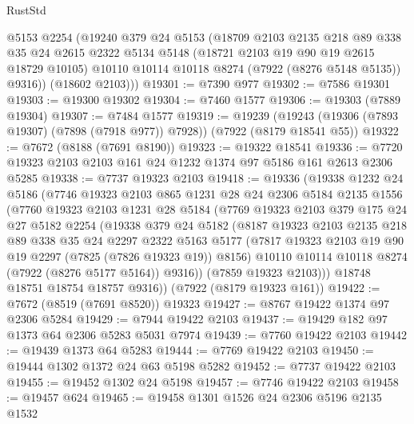 \begin{lexlean}{RustStd}
\begin{coremodule}
        @5153
        @2254
        (@19240
          @379
          @24
          @5153
          (@18709
            @2103
            @2135
            @218
            @89
            @338
            @35
            @24
            @2615
            @2322
            @5134
            @5148
            (@18721 @2103 @19 @90 @19 @2615 @18729 @10105)
            @10110
            @10114
            @10118
            @8274
            (@7922 (@8276 @5148 @5135))
            @9316))
        (@18602 @2103)))
@19301 := @7390 @977
@19302 := @7586 @19301
@19303 := @19300 @19302
@19304 := @7460 @1577
@19306 := @19303 (@7889 @19304)
@19307 := @7484 @1577
@19319 := @19239
    (@19243 (@19306 (@7893 @19307) (@7898 (@7918 @977)) @7928))
    (@7922 (@8179 @18541 @55))
@19322 := @7672 (@8188 (@7691 @8190))
@19323 := @19322 @18541
@19336 := @7720 @19323 @2103 @2103 @161 @24 @1232 @1374 @97 @5186 @161 @2613 @2306 @5285
@19338 := @7737 @19323 @2103
@19418 := @19336
    (@19338
      @1232
      @24
      @5186
      (@7746
        @19323
        @2103
        @865
        @1231
        @28
        @24
        @2306
        @5184
        @2135
        @1556
        (@7760
          @19323
          @2103
          @1231
          @28
          @5184
          (@7769
            @19323
            @2103
            @379
            @175
            @24
            @27
            @5182
            @2254
            (@19338
              @379
              @24
              @5182
              (@8187
                @19323
                @2103
                @2135
                @218
                @89
                @338
                @35
                @24
                @2297
                @2322
                @5163
                @5177
                (@7817 @19323 @2103 @19 @90 @19 @2297 (@7825 (@7826 @19323 @19)) @8156)
                @10110
                @10114
                @10118
                @8274
                (@7922 (@8276 @5177 @5164))
                @9316))
            (@7859 @19323 @2103)))
        @18748
        @18751
        @18754
        @18757
        @9316))
    (@7922 (@8179 @19323 @161))
@19422 := @7672 (@8519 (@7691 @8520)) @19323
@19427 := @8767 @19422 @1374 @97 @2306 @5284
@19429 := @7944 @19422 @2103
@19437 := @19429 @182 @97 @1373 @64 @2306 @5283 @5031 @7974
@19439 := @7760 @19422 @2103
@19442 := @19439 @1373 @64 @5283
@19444 := @7769 @19422 @2103
@19450 := @19444 @1302 @1372 @24 @63 @5198 @5282
@19452 := @7737 @19422 @2103
@19455 := @19452 @1302 @24 @5198
@19457 := @7746 @19422 @2103
@19458 := @19457 @624
@19465 := @19458 @1301 @1526 @24 @2306 @5196 @2135 @1532

\end{coremodule}
\end{lexlean}

